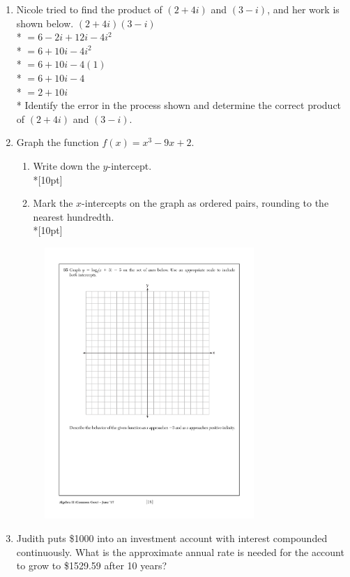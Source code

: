 \documentclass[12pt, oneside]{article}
\begin{document}
\begin{enumerate}
\item Nicole tried to find the product of $(2+ 4i)$ and $(3 - i)$, and her work is shown below.
$(2 + 4i)(3 - i)$\\*
$=6 - 2i + 12i - 4i^2$\\*
$=6 + 10i - 4i^2$\\*
$=6 + 10i - 4(1)$\\*
$=6 + 10i - 4$\\*
$=2 + 10i$\\*
Identify the error in the process shown and determine the correct product of $(2+ 4i)$ and $(3 - i)$.%
\newpage
\item Graph the function $f(x)=x^3-9x+2$. 
\begin{enumerate}
    \item Write down the $y$-intercept.\\*[10pt]
    \item Mark the $x$-intercepts on the graph as ordered pairs, rounding to the nearest hundredth.\\*[10pt]
\end{enumerate}

\begin{figure}[!ht]
    \centering
    \includegraphics[width=0.75\textwidth]{regents-grid.pdf}
\end{figure}

\item Judith puts \$1000 into an investment account with interest compounded continuously. What is the approximate annual rate is needed for the account to grow to \$1529.59 after 10 years?


\end{enumerate}
\end{document}
